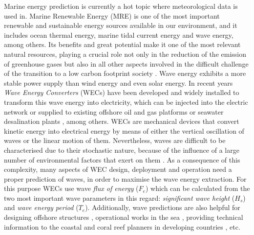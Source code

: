 \documentclass[energies,article,submit,moreauthors,pdftex]{Definitions/mdpi}
\begin{document}
		Marine energy prediction is currently a hot topic where meteorological data is used in. Marine Renewable Energy (MRE) is one of the most important renewable and sustainable energy sources available in our environment, and it includes ocean thermal energy, marine tidal current energy and wave energy, among others. Its benefits and great potential \cite{ZEYRINGER20181281} make it one of the most relevant natural resources, playing a crucial role not only in the reduction of the emission of greenhouse gases but also in all other aspects involved in the difficult challenge of the transition to a low carbon footprint society \cite{BHATTACHARYA2017157, BREDE201344}. Wave energy exhibits a more stable power supply than wind energy and even solar energy. In recent years \textit{Wave Energy Converters} (WECs) \cite{FALCAO2010899} have been developed and widely installed to transform this wave energy into electricity, which can be injected into the electric network or supplied to existing offshore oil and gas platforms \cite{OLIVEIRAPINTO2019556} or seawater desalination plants \cite{FERNANDEZPRIETO2019546}, among others. WECs are mechanical devices that convert kinetic energy into electrical energy by means of either the vertical oscillation of waves or the linear motion of them. Nevertheless, waves are difficult to be characterised due to their stochastic nature, because of the influence of a large number of environmental factors that exert on them \cite{ochi1998}. As a consequence of this complexity, many aspects of WEC design, deployment and operation \cite{CROWLEY2018159, Abdelkhalik2016, 6898109} need a proper prediction of waves, in order to maximise the wave energy extraction. For this purpose WECs use wave \textit{flux of energy} ($F_e$) which can be calculated from the two most important wave parameters in this regard: \textit{significant wave height} ($H_s$) and \textit{wave energy period} ($T_e$). Additionally, wave predictions are also helpful for designing offshore structures \cite{CHATZIIOANNOU2017126}, operational works in the sea \cite{DALGIC2015211}, providing technical information to the coastal and coral reef planners in developing countries \cite{CALLAGHAN2018123}, etc.
\end{document}
